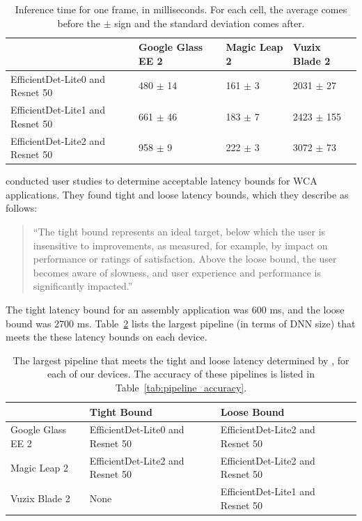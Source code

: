 \begin{table}
\begin{tabular}{|l||l|l|l|}
  \hline
  & Google Glass EE 2 & Magic Leap 2 & Vuzix Blade 2\\
  \hline
  \hline
  EfficientDet-Lite0 and Resnet 50 & 480 $\pm$ 14 & 161 $\pm$ 3 & 2031 $\pm$ 27\\
  EfficientDet-Lite1 and Resnet 50 & 661 $\pm$ 46 & 183 $\pm$ 7 & 2423 $\pm$ 155\\
  EfficientDet-Lite2 and Resnet 50 & 958 $\pm$ 9 & 222 $\pm$ 3 & 3072 $\pm$ 73\\
  \hline
\end{tabular}
  \caption{
    Inference time for one frame, in milliseconds.
    For each cell, the average comes before the $\pm$ sign and the standard
    deviation comes after.
  }\label{tab:mobile_inference}
\end{table}

\citet{chen2017} conducted user studies to determine acceptable latency bounds
for WCA applications.
They found tight and loose latency bounds, which they describe as follows:
\begin{quotation}
``The tight bound represents an ideal target, below which the
user is insensitive to improvements, as measured, for example,
by impact on performance or ratings of satisfaction. Above
the loose bound, the user becomes aware of slowness, and
user experience and performance is significantly impacted.''
\end{quotation}
The tight latency bound for an assembly application was 600 ms, and the loose
bound was 2700 ms. Table~\ref{tab:mobile_accuracy} lists the largest pipeline
(in terms of DNN size)
that meets the these latency bounds on each device.

\begin{table}
\begin{tabular}{|l||l|l|l|}
  \hline
  & Tight Bound & Loose Bound\\
  \hline
  \hline
  Google Glass EE 2 & EfficientDet-Lite0 and Resnet 50 & EfficientDet-Lite2 and Resnet 50\\
  Magic Leap 2 & EfficientDet-Lite2 and Resnet 50 & EfficientDet-Lite2 and Resnet 50\\
  Vuzix Blade 2 & None & EfficientDet-Lite1 and Resnet 50\\
  \hline
\end{tabular}
  \caption{
    The largest pipeline that meets the tight and loose latency determined by
    \citet{chen2017}, for each of our devices.
    The accuracy of these pipelines is listed in
    Table~\ref{tab:pipeline_accuracy}.
  }\label{tab:mobile_accuracy}
\end{table}

